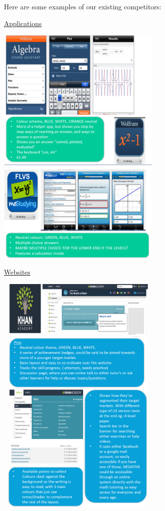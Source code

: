 \documentclass[10pt, a4paper]{article}
\begin{document}
Here are some examples of our existing competitors:

\begin{minipage}{0.45\textwidth}
\underline{Applications}

\includegraphics[width=80mm, height=120mm, keepaspectratio = true]{images/Picture4.png}
\end{minipage}
\hfill
\begin{minipage}{0.45\textwidth}
\underline{Websites}

\includegraphics[width=80mm, height=120mm, keepaspectratio = true]{images/Picture6.png}
\end{minipage}
\end{document}
